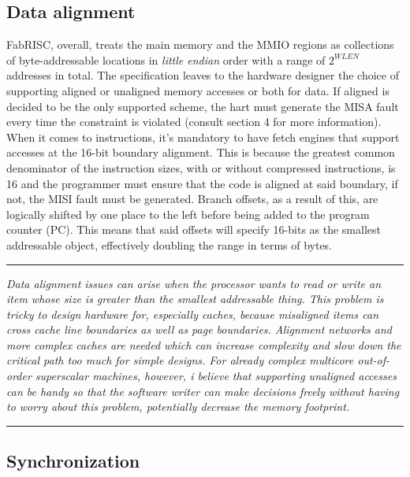 \documentclass{article}
\begin{document}
        \subsection[Data alignment]{Data alignment}

            \vspace{10pt}

            FabRISC, overall, treats the main memory and the MMIO regions as collections of byte-addressable locations in \textit{little endian} order with a range of \(2^{WLEN}\) addresses in total. The specification leaves to the hardware designer the choice of supporting aligned or unaligned memory accesses or both for data. If aligned is decided to be the only supported scheme, the hart must generate the MISA fault every time the constraint is violated (consult section 4 for more information). When it comes to instructions, it's mandatory to have fetch engines that support accesses at the 16-bit boundary alignment. This is because the greatest common denominator of the instruction sizes, with or without compressed instructions, is 16 and the programmer must ensure that the code is aligned at said boundary, if not, the MISI fault must be generated. Branch offsets, as a result of this, are logically shifted by one place to the left before being added to the program counter (PC). This means that said offsets will specify 16-bits as the smallest addressable object, effectively doubling the range in terms of bytes.

        \par\noindent\rule{\textwidth}{0.4pt}
        \textit{Data alignment issues can arise when the processor wants to read or write an item whose size is greater than the smallest addressable thing. This problem is tricky to design hardware for, especially caches, because misaligned items can cross cache line boundaries as well as page boundaries. Alignment networks and more complex caches are needed which can increase complexity and slow down the critical path too much for simple designs. For already complex multicore out-of-order superscalar machines, however, i believe that supporting unaligned accesses can be handy so that the software writer can make decisions freely without having to worry about this problem, potentially decrease the memory footprint.}
        \par\noindent\rule{\textwidth}{0.4pt}

        \subsection{Synchronization}
\end{document}
